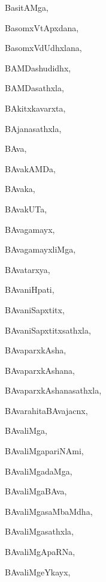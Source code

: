 \begin{multicols}{3}
{\noindent
{BasitAMga}, \pageref{BasitAMga}

\noindent
{BasomxVtApxdana}, \pageref{BasomxVtApxdana}

\noindent
{BasomxVdUdhxlana}, \pageref{BasomxVdUdhxlana}

\noindent
{BAMDashudidhx}, \pageref{BAMDashudidhx}

\noindent
{BAMDasathxla}, \pageref{BAMDasathxla}

\noindent
{BAkitxkavarxta}, \pageref{BAkitxkavarxta}

\noindent
{BAjanasathxla}, \pageref{BAjanasathxla}

\noindent
{BAva}, \pageref{BAva}

\noindent
{BAvakAMDa}, \pageref{BAvakAMDa}

\noindent
{BAvaka}, \pageref{BAvaka}

\noindent
{BAvakUTa}, \pageref{BAvakUTa}

\noindent
{BAvagamayx}, \pageref{BAvagamayx}

\noindent
{BAvagamayxliMga}, \pageref{BAvagamayxliMga}

\noindent
{BAvatarxya}, \pageref{BAvatarxya}

\noindent
{BAvaniHpati}, \pageref{BAvaniHpati}

\noindent
{BAvaniSapxtitx}, \pageref{BAvaniSapxtitx}

\noindent
{BAvaniSapxtitxsathxla}, \pageref{BAvaniSapxtitxsathxla}

\noindent
{BAvaparxkAsha}, \pageref{BAvaparxkAsha}

\noindent
{BAvaparxkAshana}, \pageref{BAvaparxkAshana}

\noindent
{BAvaparxkAshanasathxla}, \pageref{BAvaparxkAshanasathxla}

\noindent
{BAvarahitaBAvajacnx}, \pageref{BAvarahitaBAvajacnx}

\noindent
{BAvaliMga}, \pageref{BAvaliMga}

\noindent
{BAvaliMgapariNAmi}, \pageref{BAvaliMgapariNAmi}

\noindent
{BAvaliMgadaMga}, \pageref{BAvaliMgadaMga}

\noindent
{BAvaliMgaBAva}, \pageref{BAvaliMgaBAva}

\noindent
{BAvaliMgasaMbaMdha}, \pageref{BAvaliMgasaMbaMdha}

\noindent
{BAvaliMgasathxla}, \pageref{BAvaliMgasathxla}

\noindent
{BAvaliMgApaRNa}, \pageref{BAvaliMgApaRNa}

\noindent
{BAvaliMgeYkayx}, \pageref{BAvaliMgeYkayx}

}
\end{multicols}
